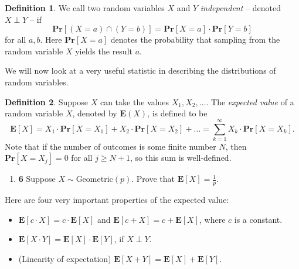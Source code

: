\documentclass[12pt]{article}
\theoremstyle{plain}
\theoremstyle{definition}
\newtheorem{defn}{Definition}[section]
\theoremstyle{remark}
\renewcommand{\Pr}{\textbf{Pr}}
\newcommand{\E}{\textbf{E}}
\newcommand{\pts}[1]{\lbrack\textbf{#1}\rbrack}
\begin{document}
\begin{defn}
We call two random variables $X$ and $Y$ \emph{independent} -- denoted $X\perp Y$ -- if \[\Pr[(X=a)\cap(Y=b)]=\Pr[X=a]\cdot\Pr[Y=b]\] for all $a,b$.  Here $\Pr[X=a]$ denotes the probability that sampling from the random variable $X$ yields the result $a$.
\end{defn}

We will now look at a very useful statistic in describing the distributions of random variables.

\begin{defn}
Suppose $X$ can take the values $X_1,X_2,\dots$. The \emph{expected value} of a random variable $X$, denoted by $\E(X)$, is defined to be \[\E[X]=X_1\cdot\Pr[X=X_1]+X_2\cdot\Pr[X=X_2]+\dots = \sum_{k=1}^\infty X_k\cdot \Pr[X=X_k].\]  Note that if the number of outcomes is some finite number $N$, then $\Pr[X=X_j] = 0$ for all $j\geq N+1$, so this sum is well-defined.
\end{defn}

\begin{enumerate}
\item \pts{6} Suppose $X\sim\text{Geometric}(p)$. Prove that $\E[X]=\frac1p$.

\begin{comment}\begin{tcolorbox}
We have \[\E[X]=p\cdot1+(1-p)\cdot(1+\E[X])\implies\E[X]=\frac1p\]

\textbf{Alternate Solution.} The probability we see a $1$ for the first time on toss $i$ is $p\cdot(1-p)^{i-1}$. Thus, \[\E[X]=\sum_{i=1}^\infty i\cdot p\cdot(1-p)^{i-1}\] For any $0<\alpha<1$, we can compute $S:=\sum_{i=1}^\infty i\cdot\alpha^i$ since \begin{align*}\frac1\alpha\cdot S-S&=\sum_{i=1}^\infty i\cdot\alpha^{i-1}-\sum_{i=1}^\infty i\cdot\alpha^i\\&=\sum_{i=0}^\infty(i+1)\cdot\alpha^i-\sum_{i=1}^\infty i\cdot\alpha^i\\&=\sum_{i=0}^\infty\alpha^i=\frac1{1-\alpha}\implies S=\frac{\alpha}{(1-\alpha)^2}\end{align*} Finally, we obtain that \[\E[X]=\frac{p}{1-p}\cdot\frac{(1-p)}{(1-(1-p))^2}=\frac1p\]
\end{tcolorbox}
\end{comment}
\end{enumerate}

Here are four very important properties of the expected value:

\begin{itemize}
\item $\E[c\cdot X]=c\cdot\E[X]$ and $\E[c+X]=c+\E[X]$, where $c$ is a constant.

\item $\E[X\cdot Y]=\E[X]\cdot\E[Y]$, if $X\perp Y$.

\item (Linearity of expectation) $\E[X+Y]=\E[X]+\E[Y]$.
\end{itemize}
\end{document}
